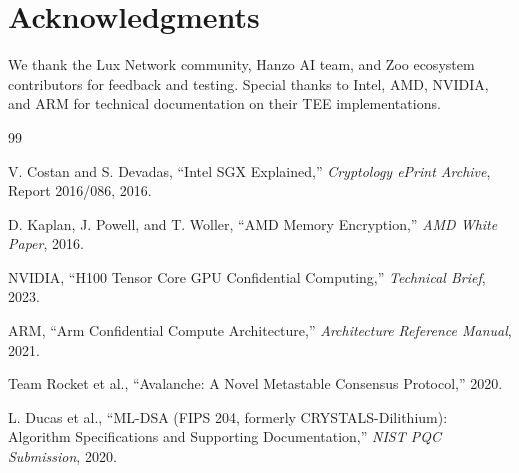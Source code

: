 \section*{Acknowledgments}


We thank the Lux Network community, Hanzo AI team, and Zoo ecosystem contributors for feedback and testing. Special thanks to Intel, AMD, NVIDIA, and ARM for technical documentation on their TEE implementations.


\begin{thebibliography}{99}

V. Costan and S. Devadas, ``Intel SGX Explained,'' \textit{Cryptology ePrint Archive}, Report 2016/086, 2016.

D. Kaplan, J. Powell, and T. Woller, ``AMD Memory Encryption,'' \textit{AMD White Paper}, 2016.

NVIDIA, ``H100 Tensor Core GPU Confidential Computing,'' \textit{Technical Brief}, 2023.

ARM, ``Arm Confidential Compute Architecture,'' \textit{Architecture Reference Manual}, 2021.

Team Rocket et al., ``Avalanche: A Novel Metastable Consensus Protocol,'' 2020.

L. Ducas et al., ``ML-DSA (FIPS 204, formerly CRYSTALS-Dilithium): Algorithm Specifications and Supporting Documentation,'' \textit{NIST PQC Submission}, 2020.

\end{thebibliography}

\appendix

